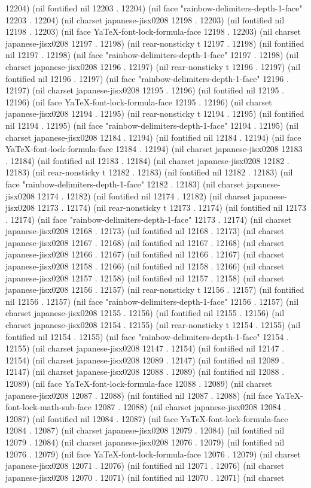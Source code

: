 12204) (nil fontified nil 12203 . 12204) (nil face "rainbow-delimiters-depth-1-face" 12203 . 12204) (nil charset japanese-jisx0208 12198 . 12203) (nil fontified nil 12198 . 12203) (nil face YaTeX-font-lock-formula-face 12198 . 12203) (nil charset japanese-jisx0208 12197 . 12198) (nil rear-nonsticky t 12197 . 12198) (nil fontified nil 12197 . 12198) (nil face "rainbow-delimiters-depth-1-face" 12197 . 12198) (nil charset japanese-jisx0208 12196 . 12197) (nil rear-nonsticky t 12196 . 12197) (nil fontified nil 12196 . 12197) (nil face "rainbow-delimiters-depth-1-face" 12196 . 12197) (nil charset japanese-jisx0208 12195 . 12196) (nil fontified nil 12195 . 12196) (nil face YaTeX-font-lock-formula-face 12195 . 12196) (nil charset japanese-jisx0208 12194 . 12195) (nil rear-nonsticky t 12194 . 12195) (nil fontified nil 12194 . 12195) (nil face "rainbow-delimiters-depth-1-face" 12194 . 12195) (nil charset japanese-jisx0208 12184 . 12194) (nil fontified nil 12184 . 12194) (nil face YaTeX-font-lock-formula-face 12184 . 12194) (nil charset japanese-jisx0208 12183 . 12184) (nil fontified nil 12183 . 12184) (nil charset japanese-jisx0208 12182 . 12183) (nil rear-nonsticky t 12182 . 12183) (nil fontified nil 12182 . 12183) (nil face "rainbow-delimiters-depth-1-face" 12182 . 12183) (nil charset japanese-jisx0208 12174 . 12182) (nil fontified nil 12174 . 12182) (nil charset japanese-jisx0208 12173 . 12174) (nil rear-nonsticky t 12173 . 12174) (nil fontified nil 12173 . 12174) (nil face "rainbow-delimiters-depth-1-face" 12173 . 12174) (nil charset japanese-jisx0208 12168 . 12173) (nil fontified nil 12168 . 12173) (nil charset japanese-jisx0208 12167 . 12168) (nil fontified nil 12167 . 12168) (nil charset japanese-jisx0208 12166 . 12167) (nil fontified nil 12166 . 12167) (nil charset japanese-jisx0208 12158 . 12166) (nil fontified nil 12158 . 12166) (nil charset japanese-jisx0208 12157 . 12158) (nil fontified nil 12157 . 12158) (nil charset japanese-jisx0208 12156 . 12157) (nil rear-nonsticky t 12156 . 12157) (nil fontified nil 12156 . 12157) (nil face "rainbow-delimiters-depth-1-face" 12156 . 12157) (nil charset japanese-jisx0208 12155 . 12156) (nil fontified nil 12155 . 12156) (nil charset japanese-jisx0208 12154 . 12155) (nil rear-nonsticky t 12154 . 12155) (nil fontified nil 12154 . 12155) (nil face "rainbow-delimiters-depth-1-face" 12154 . 12155) (nil charset japanese-jisx0208 12147 . 12154) (nil fontified nil 12147 . 12154) (nil charset japanese-jisx0208 12089 . 12147) (nil fontified nil 12089 . 12147) (nil charset japanese-jisx0208 12088 . 12089) (nil fontified nil 12088 . 12089) (nil face YaTeX-font-lock-formula-face 12088 . 12089) (nil charset japanese-jisx0208 12087 . 12088) (nil fontified nil 12087 . 12088) (nil face YaTeX-font-lock-math-sub-face 12087 . 12088) (nil charset japanese-jisx0208 12084 . 12087) (nil fontified nil 12084 . 12087) (nil face YaTeX-font-lock-formula-face 12084 . 12087) (nil charset japanese-jisx0208 12079 . 12084) (nil fontified nil 12079 . 12084) (nil charset japanese-jisx0208 12076 . 12079) (nil fontified nil 12076 . 12079) (nil face YaTeX-font-lock-formula-face 12076 . 12079) (nil charset japanese-jisx0208 12071 . 12076) (nil fontified nil 12071 . 12076) (nil charset japanese-jisx0208 12070 . 12071) (nil fontified nil 12070 . 12071) (nil charset 